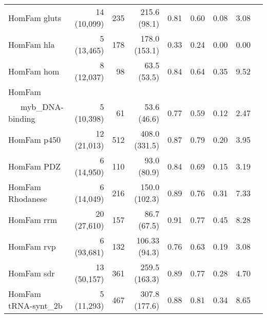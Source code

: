 \begin{table}
{\begin{tabular}{lrrrrrrrr}
HomFam        gluts            & 14 (10,099)        & 235      &215.6 (98.1)                    & 0.81            & 0.60           & 0.08           & 3.08           \\
HomFam        hla              & 5 (13,465)         & 178    &178.0 (153.1)                      & 0.33            & 0.24           & 0.00           & 0.00           \\
HomFam        hom              & 8 (12,037)         & 98     &63.5 (53.5)                      & 0.84            & 0.64           & 0.35           & 9.52           \\
HomFam        &&&&&&&\\
~~~myb\_DNA-binding & 5 (10,398)         & 61     &53.6 (46.6)                      & 0.77            & 0.59           & 0.12           & 2.47           \\
HomFam        p450             & 12 (21,013)        & 512     &408.0 (331.5)                     & 0.87            & 0.79           & 0.20           & 3.95           \\
HomFam        PDZ              & 6 (14,950)         & 110    &93.0 (80.9)                      & 0.84            & 0.69           & 0.15           & 3.19           \\
HomFam        Rhodanese        & 6 (14,049)         & 216    &150.0 (102.3)                      & 0.89            & 0.76           & 0.31           & 7.33           \\
HomFam        rrm              & 20 (27,610)        & 157       &86.7 (67.5)                   & 0.91            & 0.77           & 0.45           & 8.28           \\
HomFam        rvp              & 6 (93,681)         & 132   & 106.33 (94.3)                       & 0.76            & 0.63           & 0.19           & 3.08           \\
HomFam        sdr              & 13 (50,157)        & 361   & 259.5 (163.3)                       & 0.89            & 0.77           & 0.28           & 4.70           \\
HomFam        tRNA-synt\_2b    & 5 (11,293)         & 467  & 307.8 (177.6)                        & 0.88            & 0.81           & 0.34           & 8.65           \\

\end{tabular}}
\end{table}
